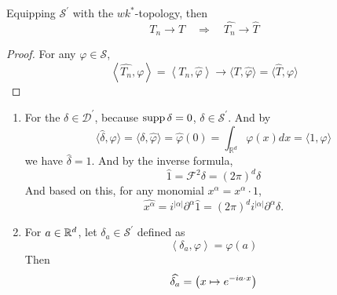 \begin{enumerate}
	\begin{prop}
		Equipping $\mathcal{S}^\prime$ with the $wk^*$-topology, then
		\begin{equation*}
			T_n \rightarrow T \quad \Rightarrow \quad \widehat{T_n} \rightarrow \widehat{T}
		\end{equation*}
	\end{prop}
	\begin{proof}
		For any $\varphi \in \mathcal{S}$,
		\begin{equation*}
			\left\langle\widehat{T_n}, \varphi\right\rangle=\left\langle T_n, \widehat{\varphi}\right\rangle \rightarrow\langle T, \widehat{\varphi}\rangle=\langle\widehat{T}, \varphi\rangle
		\end{equation*}
	\end{proof}

	\begin{exam}
		\begin{enumerate}
			\item For the $\delta \in \mathcal{D}^\prime$, because $\operatorname{supp} \delta ={0}$, $\delta \in \mathcal{S}^\prime$. And by
			\begin{equation*}
				\langle\widehat{\delta}, \varphi\rangle=\langle\delta, \widehat{\varphi}\rangle=\widehat{\varphi}(0)=\int_{\mathbb{R}^d} \varphi(x) d x=\langle 1, \varphi\rangle
			\end{equation*}
			we have $\widehat{\delta} = 1$. And by the inverse formula,
			\begin{equation*}
				\widehat{1}=\mathcal{F}^2 \delta=(2 \pi)^d \delta
			\end{equation*}
			And based on this, for any monomial $x^\alpha = x^\alpha \cdot 1$,
			\begin{equation*}
				\widehat{x^\alpha}=i^{|\alpha|} \partial^\alpha \widehat{1}=(2 \pi)^d i^{|\alpha|} \partial^\alpha \delta .
			\end{equation*}

			\item For $a \in \mathbb{R}^d$, let $\delta_a \in \mathcal{S}^\prime$ defined as
			\begin{equation*}
				\left\langle\delta_a, \varphi\right\rangle=\varphi(a)
			\end{equation*}
			Then
			\begin{equation*}
				\widehat{\delta_a} = \left(x \mapsto e^{-i a \cdot x}\right)
			\end{equation*}
			

\end{enumerate}
\end{exam}
\end{enumerate}
